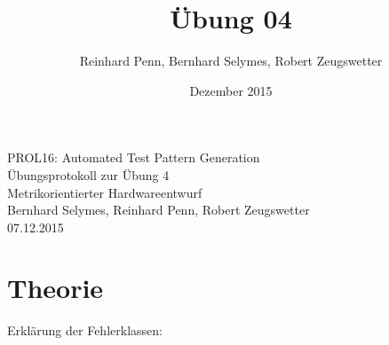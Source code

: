 \documentclass[12pt,a4paper]{article}
\begin{document}
\title{Übung 04}
\author{Reinhard Penn, Bernhard Selymes, Robert Zeugswetter}
\date{Dezember 2015}

\normalsize



\newcommand{\Uebung}{ScanChainInsertion}
\newcommand{\srcpath}{../../src}
\newcommand{\simpath}{../../sim}
\newcommand{\synpath}{../../syn}



\begin{center}
PROL16: Automated Test Pattern Generation\\
Übungsprotokoll zur Übung 4\\
Metrikorientierter Hardwareentwurf\\
Bernhard Selymes, Reinhard Penn, Robert Zeugswetter\\
07.12.2015
\end{center}

\section{Theorie}

Erklärung der Fehlerklassen:
\end{document}
